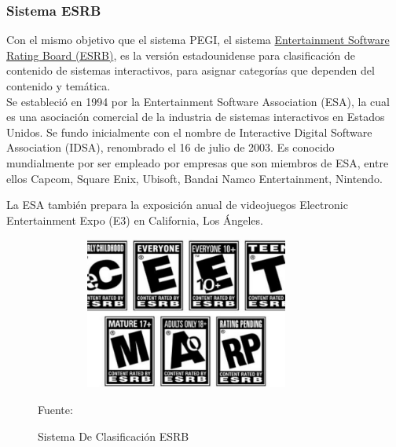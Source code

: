 \subsubsection{Sistema ESRB}

Con el mismo objetivo que el sistema PEGI, el sistema \href{https://www.esrb.org/}{Entertainment Software Rating Board (ESRB)}, es la versión estadounidense para clasificación de contenido de sistemas interactivos, para asignar categorías que dependen del contenido y temática. 
\\
Se estableció en 1994 por la Entertainment Software Association (ESA), la cual es una asociación comercial de la industria de sistemas interactivos en Estados Unidos. Se fundo inicialmente con el nombre de Interactive Digital Software Association (IDSA), renombrado el 16 de julio de 2003. Es conocido mundialmente por ser empleado por empresas que son miembros de ESA, entre ellos Capcom, Square Enix, Ubisoft, Bandai Namco Entertainment, Nintendo. 

La ESA también prepara la exposición anual de videojuegos Electronic Entertainment Expo (E3) en California, Los Ángeles.

\begin{figure}[t!]
	\centering
	\includegraphics[width=10cm,height=5cm,]{./Images/esrb.jpg}
	\caption{Sistema De Clasificación ESRB}
	\footnotesize Fuente: \cite{esrb}
	\label{esrb}
\end{figure}

